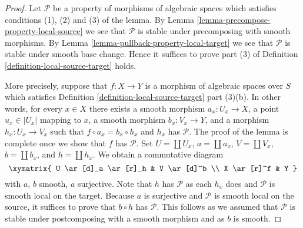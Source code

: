 \begin{proof}
Let $\mathcal{P}$ be a property of morphisms of algebraic spaces which
satisfies conditions (1), (2) and (3) of the lemma. By
Lemma \ref{lemma-precompose-property-local-source}
we see that $\mathcal{P}$ is stable under precomposing with
smooth morphisms. By
Lemma \ref{lemma-pullback-property-local-target}
we see that $\mathcal{P}$ is stable under smooth base change.
Hence it suffices to prove part (3) of
Definition \ref{definition-local-source-target}
holds.

\medskip\noindent
More precisely, suppose that $f : X \to Y$ is a morphism
of algebraic spaces over $S$ which satisfies
Definition \ref{definition-local-source-target} part (3)(b).
In other words, for every $x \in X$ there exists a smooth
morphism $a_x : U_x \to X$, a point $u_x \in |U_x|$ mapping to $x$,
a smooth morphism $b_x : V_x \to Y$, and a morphism $h_x : U_x \to V_x$
such that $f \circ a_x = b_x \circ h_x$ and $h_x$ has $\mathcal{P}$.
The proof of the lemma is complete once we show that $f$ has $\mathcal{P}$.
Set $U = \coprod U_x$, $a = \coprod a_x$, $V = \coprod V_x$,
$b = \coprod b_x$, and $h = \coprod h_x$. We obtain a
commutative diagram
$$
\xymatrix{
U \ar[d]_a \ar[r]_h & V \ar[d]^b \\
X \ar[r]^f & Y
}
$$
with $a$, $b$ smooth, $a$ surjective. Note that $h$ has $\mathcal{P}$
as each $h_x$ does and $\mathcal{P}$ is smooth local on the target.
Because $a$ is surjective and $\mathcal{P}$ is smooth local on the source,
it suffices to prove that $b \circ h$ has $\mathcal{P}$.
This follows as we assumed that $\mathcal{P}$ is stable under
postcomposing with a smooth morphism and as $b$ is smooth.
\end{proof}

